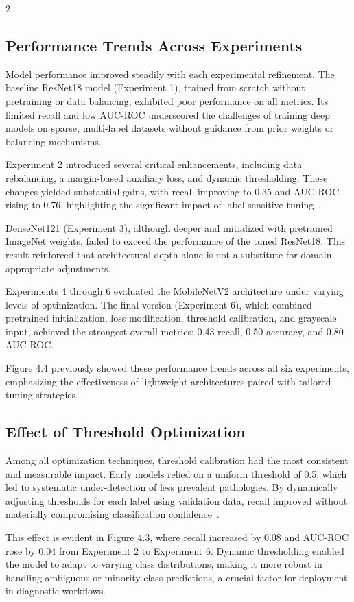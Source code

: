 \documentclass[12pt]{article}
\begin{document}
\begin{multicols}{2}
\subsection{Performance Trends Across Experiments}
Model performance improved steadily with each experimental refinement. The baseline ResNet18 model (Experiment 1), trained from scratch without pretraining or data balancing, exhibited poor performance on all metrics. Its limited recall and low AUC-ROC underscored the challenges of training deep models on sparse, multi-label datasets without guidance from prior weights or balancing mechanisms.

Experiment 2 introduced several critical enhancements, including data rebalancing, a margin-based auxiliary loss, and dynamic thresholding. These changes yielded substantial gains, with recall improving to 0.35 and AUC-ROC rising to 0.76, highlighting the significant impact of label-sensitive tuning~\cite{12}.

DenseNet121 (Experiment 3), although deeper and initialized with pretrained ImageNet weights, failed to exceed the performance of the tuned ResNet18. This result reinforced that architectural depth alone is not a substitute for domain-appropriate adjustments.

Experiments 4 through 6 evaluated the MobileNetV2 architecture under varying levels of optimization. The final version (Experiment 6), which combined pretrained initialization, loss modification, threshold calibration, and grayscale input, achieved the strongest overall metrics: 0.43 recall, 0.50 accuracy, and 0.80 AUC-ROC.

Figure 4.4 previously showed these performance trends across all six experiments, emphasizing the effectiveness of lightweight architectures paired with tailored tuning strategies.

\subsection{Effect of Threshold Optimization}
Among all optimization techniques, threshold calibration had the most consistent and measurable impact. Early models relied on a uniform threshold of 0.5, which led to systematic under-detection of less prevalent pathologies. By dynamically adjusting thresholds for each label using validation data, recall improved without materially compromising classification confidence~\cite{12}.

This effect is evident in Figure 4.3, where recall increased by 0.08 and AUC-ROC rose by 0.04 from Experiment 2 to Experiment 6. Dynamic thresholding enabled the model to adapt to varying class distributions, making it more robust in handling ambiguous or minority-class predictions, a crucial factor for deployment in diagnostic workflows.


\end{multicols}
\end{document}
